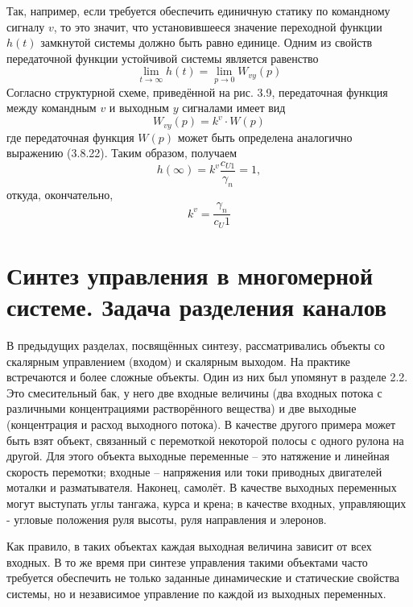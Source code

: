 Так, например, если требуется обеспечить единичную статику по командному сигналу $v$, то это значит, что установившееся значение переходной функции $h(t)$ замкнутой системы должно быть равно единице. Одним из свойств передаточной функции устойчивой системы является равенство
\begin{equation}
	\lim\limits_{t\to\infty}h(t)=\lim\limits_{p\to0}W_{vy}(p)
\end{equation}
Согласно структурной схеме, приведённой на  рис. 3.9, передаточная функция между командным $v$ и выходным $y$ сигналами имеет вид
\begin{equation}
	W_{vy}(p)=k^v\cdot W(p)
\end{equation}
где передаточная функция $W(p)$ может быть определена аналогично выражению (3.8.22). Таким образом, получаем
\begin{equation}
	h(\infty)=k^v\dfrac{c_{U1}}{\gamma_n}=1,
\end{equation}
откуда, окончательно,
\begin{equation}
	k^v=\dfrac{\gamma_n}{c_U1}
\end{equation}
\newpage

\section{Синтез управления в многомерной системе. Задача разделения каналов}
В предыдущих разделах, посвящённых синтезу, рассматривались объекты со скалярным управлением (входом) и скалярным выходом. На практике встречаются и более сложные объекты. Один из них был упомянут в разделе 2.2. Это смесительный бак, у него две входные величины (два входных потока с различными концентрациями растворённого вещества) и две выходные (концентрация и расход выходного потока). В качестве другого примера может быть взят объект, связанный с перемоткой некоторой полосы с одного рулона на другой. Для этого объекта выходные переменные – это натяжение и линейная скорость перемотки; входные – напряжения или токи приводных двигателей моталки и разматывателя. Наконец, самолёт. В качестве выходных переменных могут выступать углы тангажа, курса и крена; в качестве входных, управляющих - угловые положения руля высоты, руля направления и элеронов.

Как правило, в таких объектах каждая выходная величина зависит от всех входных. В то же время при синтезе управления такими объектами часто требуется обеспечить не только заданные динамические и статические свойства системы, но и независимое управление по каждой из выходных переменных.

